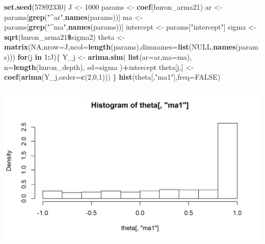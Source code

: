 \documentclass[]{article}
\newenvironment{Shaded}{\begin{snugshade}}{\end{snugshade}}
\newcommand{\KeywordTok}[1]{\textcolor[rgb]{0.13,0.29,0.53}{\textbf{#1}}}
\newcommand{\DataTypeTok}[1]{\textcolor[rgb]{0.13,0.29,0.53}{#1}}
\newcommand{\DecValTok}[1]{\textcolor[rgb]{0.00,0.00,0.81}{#1}}
\newcommand{\StringTok}[1]{\textcolor[rgb]{0.31,0.60,0.02}{#1}}
\newcommand{\OtherTok}[1]{\textcolor[rgb]{0.56,0.35,0.01}{#1}}
\newcommand{\ControlFlowTok}[1]{\textcolor[rgb]{0.13,0.29,0.53}{\textbf{#1}}}
\newcommand{\OperatorTok}[1]{\textcolor[rgb]{0.81,0.36,0.00}{\textbf{#1}}}
\newcommand{\NormalTok}[1]{#1}
\begin{document}
\begin{Shaded}
\begin{Highlighting}[]
\KeywordTok{set.seed}\NormalTok{(}\DecValTok{57892330}\NormalTok{)}
\NormalTok{J <-}\StringTok{ }\DecValTok{1000}
\NormalTok{params <-}\StringTok{ }\KeywordTok{coef}\NormalTok{(huron_arma21)}
\NormalTok{ar <-}\StringTok{ }\NormalTok{params[}\KeywordTok{grep}\NormalTok{(}\StringTok{"^ar"}\NormalTok{,}\KeywordTok{names}\NormalTok{(params))]}
\NormalTok{ma <-}\StringTok{ }\NormalTok{params[}\KeywordTok{grep}\NormalTok{(}\StringTok{"^ma"}\NormalTok{,}\KeywordTok{names}\NormalTok{(params))]}
\NormalTok{intercept <-}\StringTok{ }\NormalTok{params[}\StringTok{"intercept"}\NormalTok{]}
\NormalTok{sigma <-}\StringTok{ }\KeywordTok{sqrt}\NormalTok{(huron_arma21}\OperatorTok{\$}\NormalTok{sigma2)}
\NormalTok{theta <-}\StringTok{ }\KeywordTok{matrix}\NormalTok{(}\OtherTok{NA}\NormalTok{,}\DataTypeTok{nrow=}\NormalTok{J,}\DataTypeTok{ncol=}\KeywordTok{length}\NormalTok{(params),}\DataTypeTok{dimnames=}\KeywordTok{list}\NormalTok{(}\OtherTok{NULL}\NormalTok{,}\KeywordTok{names}\NormalTok{(params)))}
\ControlFlowTok{for}\NormalTok{(j }\ControlFlowTok{in} \DecValTok{1}\OperatorTok{:}\NormalTok{J)\{}
\NormalTok{   Y_j <-}\StringTok{ }\KeywordTok{arima.sim}\NormalTok{(}
      \KeywordTok{list}\NormalTok{(}\DataTypeTok{ar=}\NormalTok{ar,}\DataTypeTok{ma=}\NormalTok{ma),}
      \DataTypeTok{n=}\KeywordTok{length}\NormalTok{(huron_depth),}
      \DataTypeTok{sd=}\NormalTok{sigma}
\NormalTok{   )}\OperatorTok{+}\NormalTok{intercept}
\NormalTok{   theta[j,] <-}\StringTok{ }\KeywordTok{coef}\NormalTok{(}\KeywordTok{arima}\NormalTok{(Y_j,}\DataTypeTok{order=}\KeywordTok{c}\NormalTok{(}\DecValTok{2}\NormalTok{,}\DecValTok{0}\NormalTok{,}\DecValTok{1}\NormalTok{)))}
\NormalTok{\}}
\KeywordTok{hist}\NormalTok{(theta[,}\StringTok{"ma1"}\NormalTok{],}\DataTypeTok{freq=}\OtherTok{FALSE}\NormalTok{) }
\end{Highlighting}
\end{Shaded}

\begin{center}\includegraphics{figure/intro-simA-1} \end{center}
\end{document}
